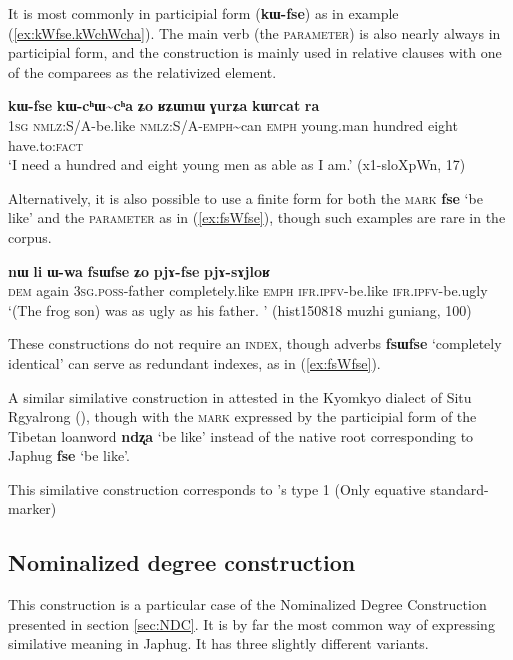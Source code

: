 \documentclass[oneside,a4paper,11pt]{article}
\newcommand{\ipa}[1]{{\phon\textbf{#1}}} %
\newcommand{\forme}[2]{\ipa{#1} `#2'}
\newcommand{\rdp}{\textasciitilde{}}
\begin{document}
It is most commonly in participial form (\ipa{kɯ-fse}) as in  example (\ref{ex:kWfse.kWchWcha}). The main verb (the \textsc{parameter}) is also nearly always in participial form, and the construction is mainly used in relative clauses with one of the comparees as the relativized element.

\begin{exe}
\ex \label{ex:kWfse.kWchWcha}
\gll \ipa{aʑo} 	\ipa{kɯ-fse} 	\ipa{kɯ-cʰɯ\rdp{}cʰa} 	\ipa{ʑo} 	\ipa{ʁʑɯnɯ} 	\ipa{ɣurʑa} 	\ipa{kɯrcat} 	\ipa{ra}  \\
\textsc{1sg} \textsc{nmlz}:S/A-be.like \textsc{nmlz}:S/A-\textsc{emph}\rdp{}can \textsc{emph} young.man hundred eight have.to:\textsc{fact} \\
\glt `I need a hundred and eight young men as able as I am.' (x1-sloXpWn, 17)
\end{exe}

Alternatively, it is also possible to use a finite form for both the \textsc{mark} \forme{fse}{be like} and the \textsc{parameter} as in (\ref{ex:fsWfse}), though such examples are rare in the corpus.

\begin{exe}
\ex \label{ex:fsWfse}
\gll
\ipa{nɯ} 	\ipa{li} 	\ipa{ɯ-wa} 	\ipa{fsɯfse} 	\ipa{ʑo} 	\ipa{pjɤ-fse} 	\ipa{pjɤ-sɤjloʁ} \\
\textsc{dem} again \textsc{3sg.poss}-father completely.like \textsc{emph} \textsc{ifr.ipfv}-be.like \textsc{ifr.ipfv}-be.ugly \\
\glt `(The frog son) was as ugly as his father. ' (hist150818 muzhi guniang, 100)
\end{exe}

These constructions do not require an \textsc{index}, though adverbs \forme{fsɯfse}{completely identical} can serve as redundant indexes, as in (\ref{ex:fsWfse}).

A similar similative construction in attested in the Kyomkyo dialect of Situ Rgyalrong (\citealt[238]{prins11kyomkyo}), though with the \textsc{mark} expressed by the participial form of the Tibetan loanword \forme{ndʐa}{be like} instead of the native root corresponding to Japhug \forme{fse}{be like}.

This similative construction corresponds to \citealt{haspelmath17equative}'s type 1 (Only equative standard-marker)

\subsection{Nominalized degree construction} \label{sec:NDC.similative}
This construction is a particular case of the Nominalized Degree Construction presented in section \ref{sec:NDC}. It is by far the most common way of expressing similative meaning in Japhug. It has three slightly different variants. 
\end{document}
